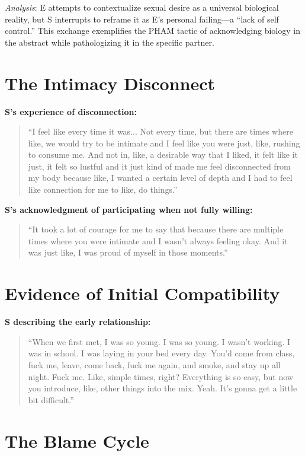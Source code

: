 \documentclass[12pt,openany]{book}
\numberwithin{equation}{chapter}
\begin{document}
\textit{Analysis}: E attempts to contextualize sexual desire as a universal biological reality, but S interrupts to reframe it as E's personal failing---a ``lack of self control.'' This exchange exemplifies the PHAM tactic of acknowledging biology in the abstract while pathologizing it in the specific partner.

\section{The Intimacy Disconnect}

\textbf{S's experience of disconnection:}
\begin{quote}
``I feel like every time it was... Not every time, but there are times where like, we would try to be intimate and I feel like you were just, like, rushing to consume me. And not in, like, a desirable way that I liked, it felt like it just, it felt so lustful and it just kind of made me feel disconnected from my body because like, I wanted a certain level of depth and I had to feel like connection for me to like, do things.''
\end{quote}

\textbf{S's acknowledgment of participating when not fully willing:}
\begin{quote}
``It took a lot of courage for me to say that because there are multiple times where you were intimate and I wasn't always feeling okay. And it was just like, I was proud of myself in those moments.''
\end{quote}

\section{Evidence of Initial Compatibility}

\textbf{S describing the early relationship:}
\begin{quote}
``When we first met, I was so young. I was so young. I wasn't working. I was in school. I was laying in your bed every day. You'd come from class, fuck me, leave, come back, fuck me again, and smoke, and stay up all night. Fuck me. Like, simple times, right? Everything is so easy, but now you introduce, like, other things into the mix. Yeah. It's gonna get a little bit difficult.''
\end{quote}

\section{The Blame Cycle}
\end{document}
